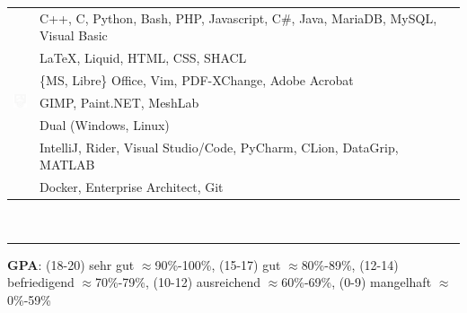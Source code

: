 \documentclass[onside]{article}
\newcommand{\externallink}[2]{
    \href{#1}{\scalebox{#2}{\faExternalLink}}
}
\renewcommand{\externallink}[3]{%
    \ifthenelse{\equal{#3}{true}}{%
        \href{#1}{$^{\scalebox{#2}{\faExternalLink}}$}%
    }{%
        \href{#1}{\scalebox{#2}{\faExternalLink}}%
    }%
}
\renewcommand{\externallink}[5]{%
    \href{#1}{\raisebox{{#3}ex}{\hspace{{#4}em}\rotatebox{#5}{\scalebox{#2}{\faExternalLink}}}}%
}
\begin{document}
{\begin{minipage}[t][\textheight-2\fboxsep-2\fboxrule][t]{\dimexpr0.40\textwidth-2\fboxrule-2\fboxsep\relax}
        \begin{tabularx}{\textwidth}{cY}
            \faCode{}        & {\textcolor{green!75!black}{C++}}, {\textcolor{green!75!black}{C}}, {\textcolor{red!45!white}{Python}}, {\textcolor{magenta!40!white}{Bash}}, {\textcolor{green!75!black}{PHP}}, {\textcolor{green!75!black}{Javascript}}, {\textcolor{red!45!white}{C\#}}, {\textcolor{red!45!white}{Java}}, {\textcolor{green!75!black}{MariaDB}}, {\textcolor{green!75!black}{MySQL}}, {\textcolor{magenta!40!white}{Visual Basic}} \\
            \faPen*{}        & {\textcolor{red!45!white}{\LaTeX}}, {\textcolor{red!45!white}{Liquid}}, {\textcolor{red!45!white}{HTML}}, {\textcolor{green!75!black}{CSS}}, {\textcolor{magenta!40!white}{SHACL}} \\
            \faFont{}        & \{MS, Libre\} Office, Vim, PDF-XChange,  Adobe Acrobat \\
            \includegraphics[width=1.25em]{image-processing_light_mthicked} & GIMP, Paint.NET, MeshLab\\
            \faCogs{}        & Dual (Windows, Linux) \\
            \faLaptopCode{}  & IntelliJ, Rider, Visual Studio/Code, PyCharm,  CLion, DataGrip, MATLAB\\
            \faToolbox{}     & Docker, Enterprise Architect, Git
        \end{tabularx}
        \vspace{1pt} \\
        \rule{\linewidth}{0.4pt}

        \vfill
        \begin{center}
            {\tiny \textbf{GPA}: (18-20) sehr gut $\approx$90\%-100\%, (15-17) gut $\approx$80\%-89\%, (12-14) befriedigend $\approx$70\%-79\%, (10-12) ausreichend $\approx$60\%-69\%, (0-9) mangelhaft $\approx$0\%-59\%\label{ft:gpasystem}}
            \externallink{https://en.wikipedia.org/wiki/Academic_grading_in_Iran}{0.72}{0.25}{-0.15}{0}
        \end{center}
    \end{minipage}
}
\end{document}

